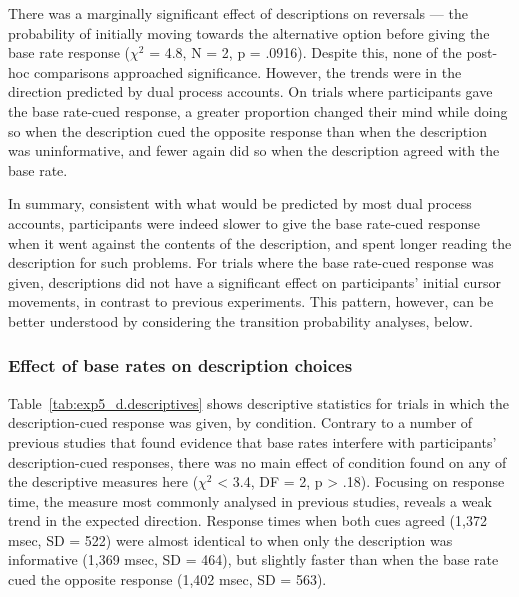 There was a marginally significant effect of descriptions on reversals
---  the probability of initially moving towards
the alternative option before giving the base rate response
($\chi^2$ = 4.8, N = 2, p = .0916).
Despite this, none of the post-hoc comparisons approached significance.
However, the trends were in the direction predicted by dual process accounts.
On trials where participants gave the base rate-cued response,
a greater proportion changed their mind while doing so
when the description cued the opposite response
than when the description was uninformative,
and fewer again did so when the description agreed with the base rate.

In summary, consistent with what would be predicted by most dual process accounts,
participants were indeed slower to give the base rate-cued response
when it went against the contents of the description,
and spent longer reading the description for such problems.
For trials where the base rate-cued response was given,
descriptions did not have a significant effect
on participants' initial cursor movements, in contrast to previous experiments.
This pattern, however, can be better understood
by considering the transition probability analyses, below.


\subsubsection{Effect of base rates on description choices}

Table~\ref{tab:exp5_d.descriptives} shows descriptive statistics
for trials in which the description-cued response was given, by condition.
Contrary to a number of previous studies that found evidence that
base rates interfere with participants' description-cued responses,
there was no main effect of condition found on any of the descriptive measures here
($\chi^2$  < 3.4, DF = 2, p > .18).
Focusing on response time, the measure most commonly analysed in previous studies,
reveals a weak trend in the expected direction.
Response times when both cues agreed (1,372 msec, SD = 522)
were almost identical to when only the description was informative (1,369 msec, SD = 464),
but slightly faster than when the base rate cued the opposite response (1,402 msec, SD = 563).

